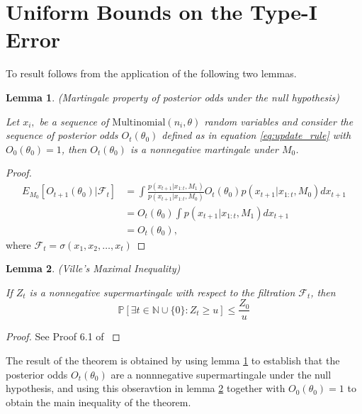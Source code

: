 \documentclass[11pt]{article}
\newtheorem{lemma}{Lemma}[section]
\begin{document}
\section{Uniform Bounds on the Type-I Error}
\label{app:type_1_error}
To result follows from the application of the following two lemmas.
\begin{lemma}(Martingale property of posterior odds under the null hypothesis)
  
  \noindent Let $x_i,$ be a sequence of $\text{Multinomial}(n_i,\theta)$ random variables and consider the sequence of posterior odds $O_t(\theta_0)$ defined as in equation \eqref{eq:update_rule} with $O_0(\theta_0)=1$, then $O_t(\theta_0)$ is a nonnegative martingale under $M_0$.
  \label{lem:posterior_odds_martingale}
    \end{lemma}
  \begin{proof}
  \begin{align*}
    E_{M_0}[O_{t+1}(\theta_0)|\mathcal{F}_t]  &= \int \frac{p(x_{t+1}|x_{1:t},M_1)}{p(x_{t+1}|x_{1:t},M_0)} O_{t}(\theta_0) p(x_{t+1}|x_{1:t},M_0) dx_{t+1}\\
    &=  O_{t}(\theta_0) \int p(x_{t+1}|x_{1:t},M_1) dx_{t+1}\\
    &=  O_{t}(\theta_0),
  \end{align*}
  where $\mathcal{F}_{t} = \sigma(x_1,x_2,\dots, x_t)$
\end{proof}

\begin{lemma}(Ville's Maximal Inequality)
  
\label{lem:durrett}
  \noindent If $Z_{t}$ is a nonnegative supermartingale with respect to the filtration $\mathcal{F}_t$, then
  \begin{equation}
    \label{eq:durrett}
    \mathbb{P}[\exists t \in \mathbb{N}\cup \lbrace 0 \rbrace : Z_t \geq u] \leq \frac{Z_0}{u}
  \end{equation}
\end{lemma}
\begin{proof}
  See Proof 6.1 of \cite{howard}
\end{proof}
The result of the theorem is obtained by using lemma \ref{lem:posterior_odds_martingale} to establish that the posterior odds $O_t(\theta_0)$ are a nonnnegative supermartingale under the null hypothesis, and using this obseravtion in lemma \ref{lem:durrett} together with  $O_0(\theta_0) = 1$  to obtain the main inequality of the theorem.
\end{document}
